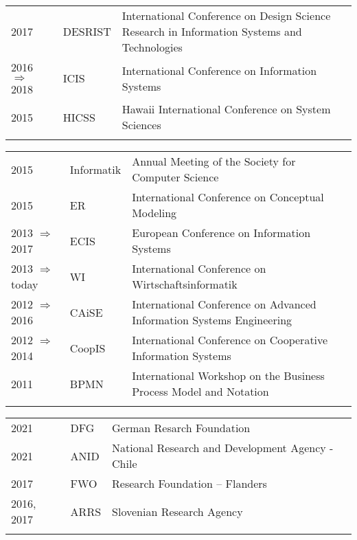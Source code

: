 \raggedright
\begin{tabular}{P{2.5cm}P{2cm}P{11cm}}

2017											& DESRIST		& International Conference on Design Science Research in Information Systems and Technologies\\\noalign{\smallskip}
2016 $\Rightarrow$ 2018			& ICIS				& International Conference on Information Systems\\\noalign{\smallskip}
2015											& HICSS			& Hawaii International Conference on System Sciences\\\noalign{\smallskip}
\end{tabular}
\begin{tabular}{P{2.5cm}P{2cm}P{11cm}}
2015											& Informatik		& Annual Meeting of the Society for Computer Science\\\noalign{\smallskip}
2015											& ER					& International Conference on Conceptual Modeling\\\noalign{\smallskip}
2013 $\Rightarrow$ 2017			& ECIS				& European Conference on Information Systems\\\noalign{\smallskip}
2013 $\Rightarrow$ today			& WI					& International Conference on Wirtschaftsinformatik\\\noalign{\smallskip}
2012 $\Rightarrow$ 2016			& CAiSE			& International Conference  on Advanced Information Systems Engineering\\\noalign{\smallskip}
2012 $\Rightarrow$ 2014			& CoopIS			& International Conference on Cooperative Information Systems\\\noalign{\smallskip}
2011											& BPMN			& International  Workshop on the Business Process Model and Notation\\\noalign{\smallskip}

\end{tabular}

\vspace{0.5cm}
\vspace{0.3cm}

\raggedright
\begin{tabular}{P{2.5cm}P{2cm}P{11cm}}
2021				& DFG & German Resarch Foundation \\\noalign{\smallskip}
2021 				& ANID & National Research and Development Agency - Chile \\\noalign{\smallskip}
2017				& FWO 	& Research Foundation – Flanders  \\\noalign{\smallskip}
2016, 2017		& ARRS & Slovenian Research Agency \\\noalign{\smallskip}
\end{tabular}
